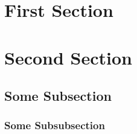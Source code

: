 \documentclass{assignment}
\begin{document}
\maketitle
\section{First Section}
\blindtext
\newpage
\section{Second Section}

\blindtext
\subsection{Some Subsection}
\blindtext
\subsubsection{Some Subsubsection}
\blindtext
\end{document}
